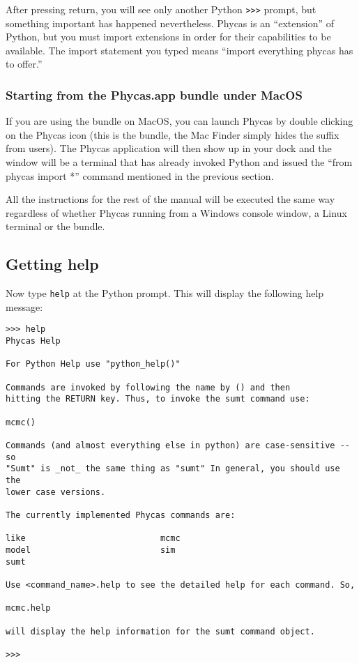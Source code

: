 \documentclass[10pt]{article}
\newcommand{\code}[1]{{\tt #1}}				%
\newcommand{\cmd}[1]{{\tt \small #1}\index{#1}}		%
\begin{document}
After pressing return, you will see only another Python \code{>>>} prompt, but something important has happened nevertheless. Phycas is an ``extension'' of Python, but you must import extensions in order for their capabilities to be available. The import statement you typed means ``import everything phycas has to offer.'' 

\subsubsection{Starting from the Phycas.app bundle under MacOS}
If you are using the  bundle on MacOS, you can launch Phycas by double clicking on the Phycas icon (this is the  bundle, the Mac Finder simply hides the  suffix from users).
The Phycas application will then show up in your dock and the window will be a terminal that has already invoked Python
and issued the ``from phycas import *'' command mentioned in the previous section.

All the instructions for the rest of the manual will be executed the same way regardless of whether Phycas running from a Windows console window, a Linux terminal or the  bundle.

\subsection{Getting help}

Now type \cmd{help} at the Python prompt. This will display the following help message:
\begin{verbatim}
>>> help
Phycas Help
    
For Python Help use "python_help()"

Commands are invoked by following the name by () and then
hitting the RETURN key. Thus, to invoke the sumt command use:

mcmc()

Commands (and almost everything else in python) are case-sensitive -- so
"Sumt" is _not_ the same thing as "sumt" In general, you should use the
lower case versions.

The currently implemented Phycas commands are:
  
like                           mcmc
model                          sim
sumt                           

Use <command_name>.help to see the detailed help for each command. So,

mcmc.help

will display the help information for the sumt command object.

>>> 
\end{verbatim}
\end{document}
